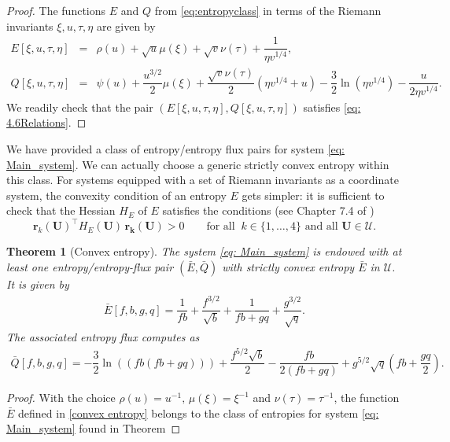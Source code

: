 \documentclass[11pt]{article}
\numberwithin{equation}{section}
\newtheorem{theorem} {Theorem}[section]
\newtheorem{counter example}[theorem]{Counter Example}
\begin{document}
{\begin{proof}
The functions $E$ and $Q$  from \eqref{eq:entropyclass}  in terms of the Riemann invariants $\xi, u, \tau, \eta$   are given by 
\[\begin{array}{rcl}
E[\xi, u, \tau, \eta]&=& \rho(u)+\sqrt{u}\mu(\xi)+\sqrt{v}\nu(\tau)+\dfrac{1}{\eta v^{1/4}},\\[2ex]
Q[\xi, u, \tau, \eta]&= &\psi(u)+\dfrac{u^{3/2}}{2}\mu(\xi)+\dfrac{\sqrt{v}\nu(\tau)}{2}\left( \eta v^{1/4}+u\right)-\dfrac{3}{2}\ln\left(\eta v^{1/4}\right)-\dfrac{u}{2\eta v^{1/4}}.
\end{array}
\]
We readily  check that the pair $\left(E[\xi, u, \tau, \eta], Q[\xi, u, \tau, \eta]\right)$ satisfies \eqref{eq: 4.6Relations}.
 \end{proof}
We have provided a class of entropy/entropy flux pairs for system \eqref{eq: Main_system}. We can actually choose a generic strictly convex entropy within this class. For systems equipped with a set of Riemann invariants as a coordinate system, the convexity condition of an entropy $E$ gets simpler:  it is sufficient to check that the Hessian  $H_{ E}$ of $E$ satisfies the conditions (see Chapter 7.4 of \cite{dafermos2005hyperbolic})
\begin{equation} \label{reducedcriterion}\mathbf{r}_k(\mathbf{U})^\top H_{ E}(\mathbf{U})\, \mathbf{r_k(\mathbf{U})}>0 \qquad \text{for all }~k\in \{1, \ldots, 4\} \text{ and all $\mathbf{U}\in \mathcal U$.}
\end{equation}
\begin{theorem}[Convex entropy] \label{Entropytheorem}
The system \eqref{eq: Main_system} is endowed with at least one entropy/entropy-flux pair $(\bar E, \bar Q)$ with strictly convex entropy $\bar E$ in $\mathcal U$. It is given by
\begin{align}\label{convex entropy}
     \bar E[f, b, g, q]= \dfrac{1}{fb}+\dfrac{f^{3/2}}{\sqrt{b}}+\dfrac{1}{fb+gq}+\dfrac{g^{3/2}}{\sqrt{q}}.
\end{align}
The associated entropy flux computes as 
\begin{align*}
    \bar Q[f, b, g, q]= -\dfrac{3}{2}\ln\left((fb(fb+gq))\right)+ \dfrac{f^{5/2}\sqrt{b}}{2}-\dfrac{fb}{2(fb+gq)}+g^{5/2}\sqrt{q}\left(fb+\dfrac{gq}{2}\right).
\end{align*}    
\end{theorem}
\begin{proof}
With the choice $\rho(u) = u^{-1}, \, \mu(\xi) = \xi^{-1}$ and $ \nu(\tau) = \tau^{-1}$, the function $\bar{E}$ defined in \eqref{convex entropy}  belongs to the class of entropies for system \eqref{eq: Main_system} found in Theorem

\end{proof}}
\end{document}
